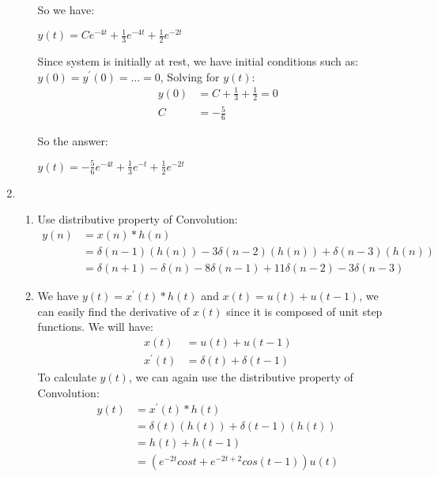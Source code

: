 \documentclass[10pt,a4paper, margin=1in]{article}
\begin{document}
\begin{enumerate}
\begin{enumerate}
	So we have:
	\begin{center}
	$y(t)=Ce^{-4t}+\frac{1}{3}e^{-4t} + \frac{1}{2}e^{-2t}$ 
	\end{center}
	
	Since system is initially at rest, we have initial conditions such as: $y(0)=y^{'}(0)=...=0$, Solving for $y(t)$:
	\begin{align*}
	y(0) &= C + \frac{1}{3} + \frac{1}{2} = 0\\
	C &= -\frac{5}{6}
	\end{align*}
    
    So the answer:
    
    \begin{center}
	$y(t)=-\frac{5}{6}e^{-4t}+\frac{1}{3}e^{-t} + \frac{1}{2}e^{-2t}$ 
    \end{center}
    \end{enumerate}
\newpage
\item 
    \begin{enumerate}
    \item
    Use distributive property of Convolution:
    \begin{align*}
    y(n) &= x(n) * h(n) \\
         &= \delta(n-1)(h(n)) - 3\delta(n-2)(h(n)) + \delta(n-3)(h(n)) \\
         &= \delta(n+1) - \delta(n) - 8\delta(n-1) + 11\delta(n-2) - 3 \delta(n-3)
    \end{align*}
    \item
    We have $y(t)=x^{'}(t)*h(t)$ and $x(t)=u(t)+u(t-1)$, we can easily find the derivative of $x(t)$ since it is composed of unit step functions. We will have: 
    \begin{align*}
   	 x(t)&=u(t)+u(t-1) \\
	 x^{'}(t)&=\delta(t) + \delta(t-1) 
    \end{align*}
    To calculate $y(t)$, we can again use the distributive property of Convolution:
    \begin{align*}
    y(t)&=x^{'}(t)*h(t) \\
         &= \delta(t)(h(t)) + \delta(t-1)(h(t)) \\
         &= h(t) + h(t-1)\\
         &= (e^{-2t}cost+e^{-2t+2}cos(t-1))u(t)
    \end{align*}
    \end{enumerate}
    

\end{enumerate}
\end{document}
